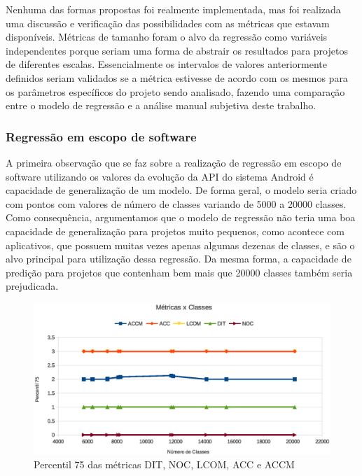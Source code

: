 Nenhuma das formas propostas foi realmente implementada, mas foi realizada uma discussão e verificação das possibilidades com as métricas que estavam disponíveis. Métricas de tamanho foram o alvo da regressão como variáveis independentes porque seriam uma forma de abstrair os resultados para projetos de diferentes escalas. Essencialmente os intervalos de valores anteriormente definidos seriam validados se a métrica estivesse de acordo com os mesmos para os parâmetros específicos do projeto sendo analisado, fazendo uma comparação entre o modelo de regressão e a análise manual subjetiva deste trabalho.

\subsubsection{Regressão em escopo de software}

A primeira observação que se faz sobre a realização de regressão em escopo de software utilizando os valores da evolução da API do sistema Android é capacidade de generalização de um modelo. De forma geral, o modelo seria criado com pontos com valores de número de classes variando de 5000 a 20000 classes. Como consequência, argumentamos que o modelo de regressão não teria uma boa capacidade de generalização para projetos muito pequenos, como acontece com aplicativos, que possuem muitas vezes apenas algumas dezenas de classes, e são o alvo principal para utilização dessa regressão. Da mesma forma, a capacidade de predição para projetos que contenham bem mais que 20000 classes também seria prejudicada. 

\begin{figure}[!htb]
\centering
\includegraphics [keepaspectratio=true,scale=0.7]{figuras/metricasxclasses.eps}
\caption{Percentil 75 das métricas DIT, NOC, LCOM, ACC e ACCM}
\label{fig:metricasxclasses}
\end{figure}


